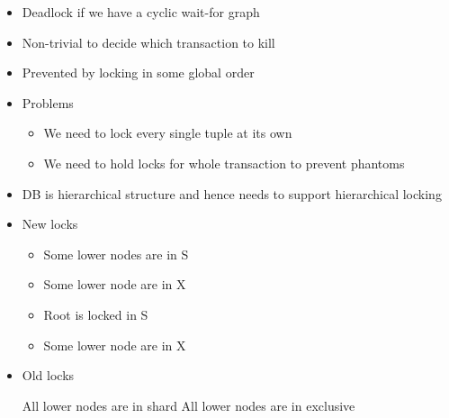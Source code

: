 \begin{itemize}
\begin{itemize}
\begin{itemize}
                    \item Deadlock if we have a cyclic wait-for graph
                    \item Non-trivial to decide which transaction to kill
                    \item Prevented by locking in some global order
                \end{itemize}
        \end{itemize}
        \begin{itemize}
            \item Problems
                \begin{itemize}
                    \item We need to lock every single tuple at its own
                    \item We need to hold locks for whole transaction to prevent phantoms
                \end{itemize}
            \item DB is hierarchical structure and hence needs to support hierarchical locking
            \item New locks
                \begin{itemize}
                        \begin{itemize}
                            \item Some lower nodes are in S
                        \end{itemize}
                        \begin{itemize}
                            \item Some lower node are in X
                        \end{itemize}
                        \begin{itemize}
                            \item Root is locked in S
                            \item Some lower node are in X
                        \end{itemize}
                \end{itemize}
            \item Old locks
                \begin{itemize}
                     All lower nodes are in shard
                     All lower nodes are in exclusive

\end{itemize}
\end{itemize}
\end{itemize}

